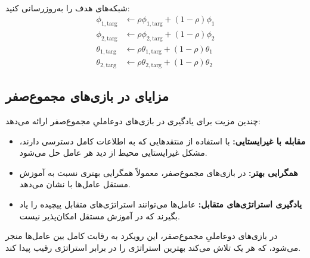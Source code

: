 \begin{algorithm}[H]
\begin{algorithmic}[1]
\begin{align*}
                    \end{align*}
                    \vspace{-35pt}
                    \State %
                    شبکه‌های هدف را به‌روزرسانی کنید:
                    \vspace{-15pt}
                    \begin{align*}
                        \phi_{1,\text{targ}} &\leftarrow \rho \phi_{1,\text{targ}} + (1-\rho) \phi_1 \\
                        \phi_{2,\text{targ}} &\leftarrow \rho \phi_{2,\text{targ}} + (1-\rho) \phi_2 \\
                        \theta_{1,\text{targ}} &\leftarrow \rho \theta_{1,\text{targ}} + (1-\rho) \theta_1 \\
                        \theta_{2,\text{targ}} &\leftarrow \rho \theta_{2,\text{targ}} + (1-\rho) \theta_2
                    \end{align*}
                \EndFor
            \EndIf
        \EndWhile
        \vspace{-15pt}
    \end{algorithmic}
\end{algorithm}

\subsection{مزایای  در بازی‌های مجموع­‌صفر}

 چندین مزیت برای یادگیری در بازی‌های دو­عاملیِ مجموع­‌صفر ارائه می‌دهد:

\begin{itemize}
    \item \textbf{مقابله با غیرایستایی:} با استفاده از منتقدهایی که به اطلاعات کامل دسترسی دارند، مشکل غیرایستایی محیط از دید هر عامل حل می‌شود.
    \item \textbf{همگرایی بهتر:} در بازی‌های مجموع­‌صفر،  معمولاً همگرایی بهتری نسبت به آموزش مستقل عامل‌ها با  نشان می‌دهد.
    \item \textbf{یادگیری استراتژی‌های متقابل:} عامل‌ها می‌توانند استراتژی‌های متقابل پیچیده را یاد بگیرند که در آموزش مستقل امکان‌پذیر نیست.
\end{itemize}

در بازی‌های دو­عاملیِ مجموع­‌صفر، این رویکرد به رقابت کامل بین عامل‌ها منجر می‌شود، که هر یک تلاش می‌کند بهترین استراتژی را در برابر استراتژی رقیب پیدا کند.